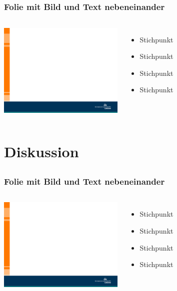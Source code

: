\subsection*{}
\begin{frame}
\frametitle{Folie mit Bild und Text nebeneinander}
	\begin{columns}
		\column{6cm}
		\vskip5mm
		\includegraphics[width=6.0cm]{style/images/master_background}\\
		\vskip5mm
    	\column{5cm}

		\begin{itemize}
		 \itemsep1.2em
		 \item Stichpunkt
      	 \item Stichpunkt
       	 \item Stichpunkt
     	 \item Stichpunkt
		\end{itemize}
	\end{columns}
\end{frame}

\section{Diskussion}
\subsection*{}
\begin{frame}
\frametitle{Folie mit Bild und Text nebeneinander}
\begin{columns}
    \column{6cm}
    \vskip5mm
 	    \includegraphics[width=6.0cm]{style/images/master_background}
    \vskip5mm
    \column{5cm}
    \vspace{0cm}
	\begin{itemize}
	 	 \itemsep1.2em
   		 \item Stichpunkt
      	 \item Stichpunkt
       	 \item Stichpunkt
     	 \item Stichpunkt
       	\end{itemize}
 \end{columns}
\end{frame}

